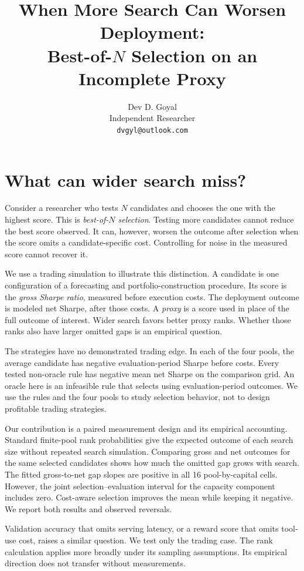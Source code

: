 \documentclass{article}
\title{When More Search Can Worsen Deployment:\\Best-of-$N$ Selection on an Incomplete Proxy}
\author{Dev D. Goyal\\Independent Researcher\\\texttt{dvgyl@outlook.com}}
\begin{document}
\maketitle
\begin{abstract}

\end{abstract}

\section{What can wider search miss?}
Consider a researcher who tests $N$ candidates and chooses the one with the highest score. This is \emph{best-of-$N$ selection}. Testing more candidates cannot reduce the best score observed. It can, however, worsen the outcome after selection when the score omits a candidate-specific cost. Controlling for noise in the measured score cannot recover it.

We use a trading simulation to illustrate this distinction. A candidate is one configuration of a forecasting and portfolio-construction procedure. Its score is the \emph{gross Sharpe ratio}, measured before execution costs. The deployment outcome is modeled net Sharpe, after those costs. A \emph{proxy} is a score used in place of the full outcome of interest. Wider search favors better proxy ranks. Whether those ranks also have larger omitted gaps is an empirical question.

The strategies have no demonstrated trading edge. In each of the four pools, the average candidate has negative evaluation-period Sharpe before costs. Every tested non-oracle rule has negative mean net Sharpe on the comparison grid. An oracle here is an infeasible rule that selects using evaluation-period outcomes. We use the rules and the four pools to study selection behavior, not to design profitable trading strategies.

Our contribution is a paired measurement design and its empirical accounting. Standard finite-pool rank probabilities give the expected outcome of each search size without repeated search simulation. Comparing gross and net outcomes for the same selected candidates shows how much the omitted gap grows with search. The fitted gross-to-net gap slopes are positive in all 16 pool-by-capital cells. However, the joint selection--evaluation interval for the capacity component includes zero. Cost-aware selection improves the mean while keeping it negative. We report both results and observed reversals.

Validation accuracy that omits serving latency, or a reward score that omits tool-use cost, raises a similar question. We test only the trading case. The rank calculation applies more broadly under its sampling assumptions. Its empirical direction does not transfer without measurements.
\end{document}
